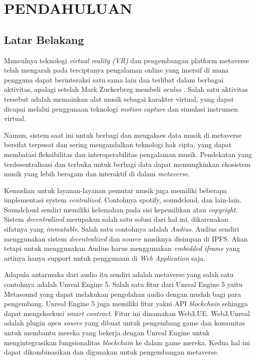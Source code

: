\chapter{PENDAHULUAN}

\section{Latar Belakang}

Munculnya teknologi \emph{virtual reality (VR)} dan pengembangan platform metaverse telah mengarah pada terciptanya
pengalaman online yang imersif di mana pengguna dapat berinteraksi satu sama lain dan terlibat dalam berbagai aktivitas, apalagi setelah  Mark Zuckerberg
membeli \emph{oculus} \parencite{luckerson2014facebook}.
Salah satu aktivitas tersebut adalah memainkan alat musik sebagai karakter virtual, yang dapat dicapai melalui penggunaan
teknologi \emph{motion capture} dan simulasi instrumen virtual.

Namun, sistem saat ini untuk berbagi dan mengakses data musik di metaverse bersifat terpusat dan sering mengandalkan teknologi
hak cipta, yang dapat membatasi fleksibilitas dan interoperabilitas pengalaman musik. Pendekatan yang terdesentralisasi dan terbuka
untuk berbagi data dapat memungkinkan ekosistem musik yang lebih beragam dan interaktif di dalam \emph{metaverse}.

Kemudian untuk layanan-layanan pemutar musik juga memiliki beberapa implementasi system \emph{centralized}. Contohnya spotify, soundcloud, dan lain-lain.
Soundcloud sendiri memiliki kelemahan pada sisi kepemilikan atau \emph{copyright}. Sistem \emph{decentralized} merupakan salah satu solusi dari hal ini, dikarenakan
sifatnya yang \emph{immutable}. Salah satu contohnya adalah \emph{Audius}. Audius sendiri menggunakan sistem \emph{decentralized} dan source musiknya disimpan di IPFS.
Akan tetapi untuk menggunakan Audius harus menggunakan \emph{embedded iframe} yang artinya hanya support untuk penggunaan di \emph{Web Application} saja.

Adapula antarmuka dari audio itu sendiri adalah metaverse yang salah satu contohnya adalah Unreal Engine 5. Salah satu fitur dari Unreal Engine 5 yaitu Metasound yang dapat melakukan pengolahan audio dengan mudah bagi para pengembang. Unreal Engine 5 juga
memiliki fitur yakni API \emph{blockchain} sehingga dapat mengeksekusi \emph{smart contract}. Fitur ini dinamakan Web3.UE. Web3.Unreal adalah plugin
\emph{open source} yang dibuat untuk pengembang game dan komunitas untuk membantu mereka yang bekerja dengan Unreal Engine untuk mengintegrasikan
fungsionalitas \emph{blockchain} ke dalam game mereka. Kedua hal ini dapat dikombinasikan dan digunakan untuk
pengembangan metaverse.

